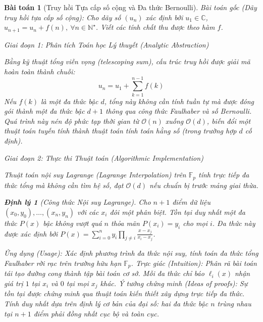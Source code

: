 \documentclass{article}
\newtheorem{baitoan}{Bài toán}
\newtheorem{dinhly}{Định lý}
\begin{document}
\begin{baitoan}[Truy hồi Tựa cấp số cộng và Đa thức Bernoulli]
 \emph{Bài toán gốc (Dãy truy hồi tựa cấp số cộng):} 
 Cho dãy số $(u_n)$ xác định bởi $u_1\in\mathbb{C}$, $u_{n+1} = u_n + f(n),\ \forall n\in\mathbb{N}^\star$. 
 Viết các tính chất thu được theo hàm $f$.

\vspace{0.5em}\noindent\emph{Giai đoạn 1: Phân tích Toán học Lý thuyết (Analytic Abstraction)}
 
 Bằng kỹ thuật tổng viễn vọng (telescoping sum), cấu trúc truy hồi được giải mã hoàn toàn thành chuỗi:
 \begin{equation}
 u_n = u_1 + \sum_{k=1}^{n-1} f(k)
 \end{equation}
 Nếu $f(k)$ là một đa thức bậc $d$, tổng này không cần tính tuần tự mà được đóng gói thành một đa thức bậc $d+1$ thông qua công thức Faulhaber và số Bernoulli. Quá trình này nén độ phức tạp thời gian từ $\mathcal{O}(n)$ xuống $\mathcal{O}(d)$, biến đổi một thuật toán tuyến tính thành thuật toán tính toán hằng số (trong trường hợp $d$ cố định).

\vspace{0.5em}\noindent\emph{Giai đoạn 2: Thực thi Thuật toán (Algorithmic Implementation)}
 
 Thuật toán nội suy Lagrange (Lagrange Interpolation) trên $\mathbb{F}_p$ tính trực tiếp đa thức tổng mà không cần tìm hệ số, đạt $\mathcal{O}(d)$ nếu chuẩn bị trước mảng giai thừa.

\begin{dinhly}[Công thức Nội suy Lagrange]
Cho $n+1$ điểm dữ liệu $(x_0, y_0), \dots, (x_n, y_n)$ với các $x_i$ đôi một phân biệt. Tồn tại duy nhất một đa thức $P(x)$ bậc không vượt quá $n$ thỏa mãn $P(x_i) = y_i$ cho mọi $i$. Đa thức này được xác định bởi $P(x) = \sum_{i=0}^n y_i \prod_{j \neq i} \frac{x - x_j}{x_i - x_j}$.
\end{dinhly}
\emph{Ứng dụng (Usage):} Xác định phương trình đa thức nội suy, tính toán đa thức tổng Faulhaber rời rạc trên trường hữu hạn $\mathbb{F}_p$.
\emph{Trực giác (Intuition):} Phân rã bài toán tái tạo đường cong thành tập bài toán cơ sở. Mỗi đa thức chỉ báo $\ell_i(x)$ nhận giá trị $1$ tại $x_i$ và $0$ tại mọi $x_j$ khác.
\emph{Ý tưởng chứng minh (Ideas of proofs):} Sự tồn tại được chứng minh qua thuật toán kiến thiết xây dựng trực tiếp đa thức. Tính duy nhất dựa trên định lý cơ bản của đại số: hai đa thức bậc $n$ trùng nhau tại $n+1$ điểm phải đồng nhất cục bộ và toàn cục.


\end{baitoan}
\end{document}

